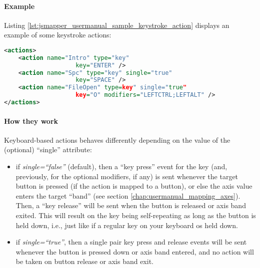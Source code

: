 \paragraph{Example}
Listing \ref{lst:jsmapper_usermanual_sample_keystroke_action} displays an example of some keystroke actions: \begin{lstlisting}[language=XML,caption={Sample keystroke actions},label={lst:jsmapper_usermanual_sample_keystroke_action}]
<actions>
	<action name="Intro" type="key" 
					key="ENTER" />
	<action name="Spc" type="key" single="true" 
					key="SPACE" />
	<action name="FileOpen" type=key" single="true" 
					key="O" modifiers="LEFTCTRL;LEFTALT" />
</actions>  
\end{lstlisting}

\paragraph{How they work}
Keyboard-based actions behaves differently depending on the value of the (optional) ``single'' attribute:
\begin{itemize}
	\item if \emph{single=``false''} (default), then a ``key press'' event for the key (and, previously, for the optional modifiers, if any) is sent whenever the target button is pressed (if the action is mapped to a button), or else the axis value enters the target ``band'' (see section \ref{chap:usermanual_mapping_axes}). Then, a ``key release'' will be sent when the button is released or axis band exited. This will result on the key being self-repeating as long as the button is held down, i.e., just like if a regular key on your keyboard os held down.
	\item if \emph{single=``true''}, then a single pair key press and release events will be sent whenever the button is pressed down or axis band entered, and no action will be taken on button release or axis band exit.
\end{itemize}


